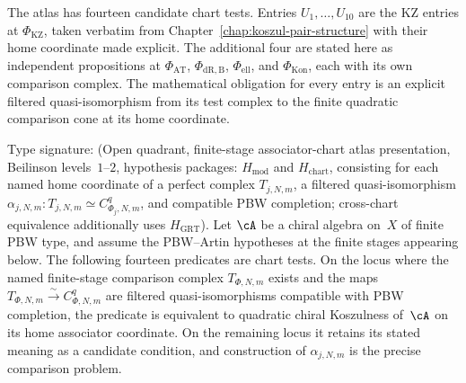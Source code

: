 The atlas has fourteen candidate chart tests. Entries $U_1,\ldots,U_{10}$
are the KZ entries at $\Phi_{\mathrm{KZ}}$, taken verbatim from
Chapter~\ref{chap:koszul-pair-structure} with their home
coordinate made explicit. The additional four are stated
here as independent propositions at $\Phi_{\mathrm{AT}}$,
$\Phi_{\mathrm{dR,B}}$, $\Phi_{\mathrm{ell}}$, and
$\Phi_{\mathrm{Kon}}$, each with its own comparison complex. The
mathematical obligation for every entry is an explicit filtered
quasi-isomorphism from its test complex to the finite quadratic
comparison cone at its home coordinate.

\begin{theorem}
\label{v1-thm:kms-fourteen-home-chart}
\ClaimStatusConditional
Type signature: \textup{(}Open quadrant, finite-stage
associator-chart atlas presentation, Beilinson levels~$1$--$2$,
hypothesis packages: $H_{\mathrm{mod}}$ and
$H_{\mathrm{chart}}$, consisting for each named home coordinate of a
perfect complex $T_{j,N,m}$, a filtered quasi-isomorphism
$\alpha_{j,N,m}\colon T_{j,N,m}\simeq C^q_{\Phi_j,N,m}$, and
compatible PBW completion; cross-chart equivalence additionally uses
$H_{\mathrm{GRT}}$\textup{)}.
Let $\cA$ be a chiral algebra on~$X$ of finite PBW type, and
assume the PBW--Artin hypotheses at the finite stages appearing
below. The following fourteen predicates are chart tests. On the locus
where the named finite-stage comparison complex
$T_{\Phi,N,m}$ exists and the maps
$T_{\Phi,N,m}\xrightarrow{\sim}C^q_{\Phi,N,m}$ are filtered
quasi-isomorphisms compatible with PBW completion, the predicate
is equivalent to quadratic chiral Koszulness of~$\cA$ on its home
associator coordinate.  On the remaining locus it retains its stated
meaning as a candidate condition, and construction of
$\alpha_{j,N,m}$ is the precise comparison problem.


\end{theorem}
